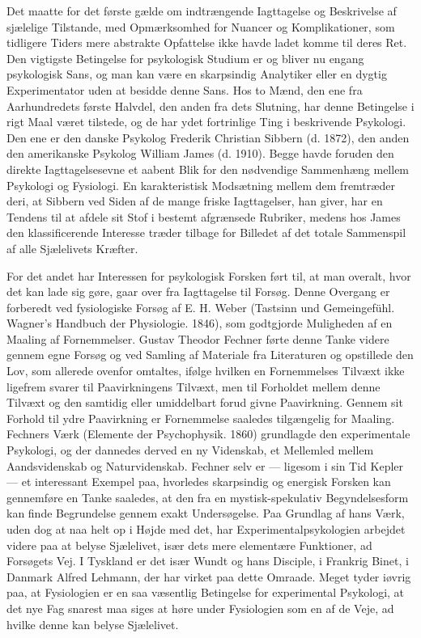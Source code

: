 \documentclass[12pt,a4paper,openany]{book}
\newcommand{\opage}[1]{\marginnote{\footnotesize\textit{[#1]}}}
\begin{document}
Det maatte for det første gælde om indtrængende Iagttagelse og
Beskrivelse af sjælelige Tilstande, med Opmærksomhed for Nuancer
og Komplikationer, som tidligere Tiders mere abstrakte Opfattelse
ikke havde ladet komme til deres Ret. Den vigtigste Betingelse for
psykologisk Studium er og bliver nu engang psykologisk Sans, og
man kan være en skarpsindig Analytiker eller en dygtig Experimentator
uden at besidde denne Sans. Hos to Mænd, den ene fra Aarhundredets
første Halvdel, den anden fra dets Slutning, har denne
Betingelse i rigt Maal været tilstede, og de har ydet fortrinlige Ting
i beskrivende Psykologi. Den ene er den danske Psykolog Frederik
Christian Sibbern (d. 1872), den anden den amerikanske Psykolog
\opage{48}William James (d. 1910). Begge havde foruden den direkte Iagttagelsesevne
et aabent Blik for den nødvendige Sammenhæng mellem
Psykologi og Fysiologi. En karakteristisk Modsætning mellem dem
fremtræder deri, at Sibbern ved Siden af de mange friske Iagttagelser,
han giver, har en Tendens til at afdele sit Stof i bestemt afgrænsede
Rubriker, medens hos James den klassificerende Interesse træder
tilbage for Billedet af det totale Sammenspil af alle Sjælelivets
Kræfter.

For det andet har Interessen for psykologisk Forsken ført til, at
man overalt, hvor det kan lade sig gøre, gaar over fra Iagttagelse
til Forsøg. Denne Overgang er forberedt ved fysiologiske Forsøg af
E. H. Weber (Tastsinn und Gemeingefühl. Wagner’s Handbuch der
Physiologie. 1846), som godtgjorde Muligheden af en Maaling af
Fornemmelser. Gustav Theodor Fechner førte denne Tanke videre
gennem egne Forsøg og ved Samling af Materiale fra Literaturen og
opstillede den Lov, som allerede ovenfor omtaltes, ifølge hvilken en
Fornemmelses Tilvæxt ikke ligefrem svarer til Paavirkningens Tilvæxt,
men til Forholdet mellem denne Tilvæxt og den samtidig eller
umiddelbart forud givne Paavirkning. Gennem sit Forhold til ydre
Paavirkning er Fornemmelse saaledes tilgængelig for Maaling.
Fechners Værk (Elemente der Psychophysik. 1860) grundlagde
den experimentale Psykologi, og der dannedes derved en ny Videnskab,
et Mellemled mellem Aandsvidenskab og Naturvidenskab.
Fechner selv er --- ligesom i sin Tid Kepler --- et interessant Exempel
paa, hvorledes skarpsindig og energisk Forsken kan gennemføre en
Tanke saaledes, at den fra en mystisk-spekulativ Begyndelsesform
kan finde Begrundelse gennem exakt Undersøgelse. Paa Grundlag af
hans Værk, uden dog at naa helt op i Højde med det, har Experimentalpsykologien
arbejdet videre paa at belyse Sjælelivet, især dets
mere elementære Funktioner, ad Forsøgets Vej. I Tyskland er det
især Wundt og hans Disciple, i Frankrig Binet, i Danmark Alfred
Lehmann, der har virket paa dette Omraade. Meget tyder iøvrig
paa, at Fysiologien er en saa væsentlig Betingelse for experimental
Psykologi, at det nye Fag snarest maa siges at høre under Fysiologien
som en af de Veje, ad hvilke denne kan belyse Sjælelivet.
\end{document}
